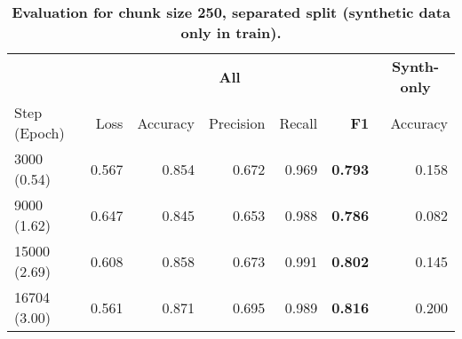 \begin{table}[H]
\centering
\small
\caption[Evaluation for Chunk Size 250, Seperated Split]{\textbf{Evaluation for chunk size 250, separated split (synthetic data only in train).}}
\label{tab:250_separated}
\begin{tabular}{@{}lrrrr rr@{}}
\toprule
  & \multicolumn{5}{c}{\textbf{All}} 
  & \multicolumn{1}{c}{\textbf{Synth-only}}  \\
\cmidrule(lr){2-6} \cmidrule(lr){7-7} 
Step (Epoch) & Loss & Accuracy & Precision & Recall & \textbf{F1} & Accuracy \\
\midrule
3000 (0.54) & 0.567 & 0.854 & 0.672 & 0.969 & \textbf{0.793} & 0.158 \\
9000 (1.62) & 0.647 & 0.845 & 0.653 & 0.988 & \textbf{0.786} & 0.082 \\
15000 (2.69) & 0.608 & 0.858 & 0.673 & 0.991 & \textbf{0.802} & 0.145 \\
16704 (3.00) & 0.561 & 0.871 & 0.695 & 0.989 & \textbf{0.816} & 0.200 \\
\bottomrule
\end{tabular}
\end{table}
